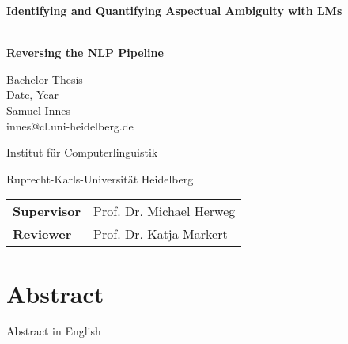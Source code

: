 
\sffamily
{} %
\pagestyle{plain}

\thispagestyle{empty}


\begin{center}

\begin{Huge}
\vspace{10mm}
\textbf{Identifying and Quantifying Aspectual Ambiguity with LMs}
\end{Huge}\\[5mm]
\textbf{\Large Reversing the NLP Pipeline}


\vspace{70mm}
\begin{large}
Bachelor Thesis\\
Date, Year\\

\vspace{1 cm}
Samuel Innes\\
innes@cl.uni-heidelberg.de\\
\end{large}
\vspace{2cm}

\begin{Large}
Institut für Computerlinguistik\\ %
\vspace{3mm}
\end{Large}{\Large Ruprecht-Karls-Universität Heidelberg}\\ %
\vspace{2cm}

\begin{tabular}{ll}
\textbf{Supervisor} & Prof. Dr. Michael Herweg\\
\textbf{Reviewer} & Prof. Dr. Katja Markert\\
\end{tabular}
\end{center}

\clearpage


\pagestyle{useheadings} %

\chapter*{Abstract}\label{c.abstract}
Abstract in English

